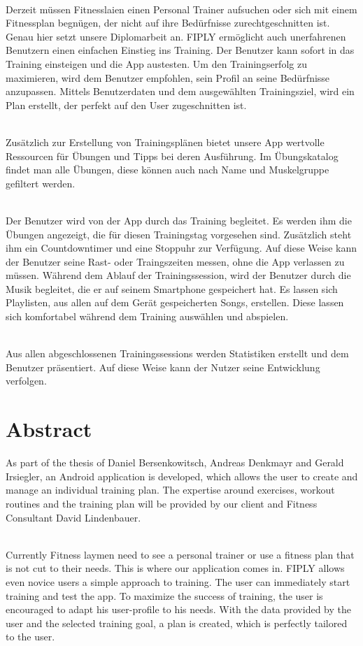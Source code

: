 \documentclass[FIPLY_base.tex]{subfiles}
\begin{document}
\ \\
Derzeit müssen Fitnesslaien einen Personal Trainer aufsuchen oder sich mit einem Fitnessplan begnügen, der nicht auf ihre Bedürfnisse zurechtgeschnitten ist. Genau hier setzt unsere Diplomarbeit an. FIPLY ermöglicht auch unerfahrenen Benutzern einen einfachen Einstieg ins Training. Der Benutzer kann sofort in das Training einsteigen und die App austesten.
Um den Trainingserfolg zu maximieren, wird dem Benutzer empfohlen, sein Profil an seine Bedürfnisse anzupassen.
Mittels Benutzerdaten und dem ausgewählten Trainingsziel, wird ein Plan erstellt, der perfekt auf den User zugeschnitten ist.

\ \\
Zusätzlich zur Erstellung von Trainingsplänen bietet unsere App wertvolle Ressourcen für Übungen und Tipps bei deren Ausführung. Im Übungskatalog findet man alle Übungen, diese können auch nach Name und Muskelgruppe gefiltert werden.

\ \\
Der Benutzer wird von der App durch das Training begleitet. Es werden ihm die Übungen angezeigt, die für diesen Trainingstag vorgesehen sind. Zusätzlich steht ihm ein Countdowntimer und eine Stoppuhr zur Verfügung. Auf diese Weise kann der Benutzer seine Rast- oder Traingszeiten messen, ohne die App verlassen zu müssen.  
Während dem Ablauf der Trainingssession, wird der Benutzer durch die Musik begleitet, die er auf seinem Smartphone gespeichert hat.
Es lassen sich Playlisten, aus allen auf dem Gerät gespeicherten Songs, erstellen. Diese lassen sich komfortabel während dem Training auswählen und abspielen.

\ \\
Aus allen abgeschlossenen Trainingssessions werden Statistiken erstellt und dem Benutzer präsentiert.
Auf diese Weise kann der Nutzer seine Entwicklung verfolgen. 

\section{Abstract}
As part of the thesis of Daniel Bersenkowitsch, Andreas Denkmayr and Gerald Irsiegler, an Android application is developed, which allows the user to create and manage an individual training plan.
The expertise around exercises, workout routines and the training plan will be provided by our client and Fitness Consultant David Lindenbauer.

\ \\
Currently Fitness laymen need to see a personal trainer or use a fitness plan that is not cut to their needs. This is where our application comes in. FIPLY allows even novice users a simple approach to training. The user can immediately start training and test the app.
To maximize the success of training, the user is encouraged to adapt his user-profile to his needs.
With the data provided by the user and the selected training goal, a plan is created, which is perfectly tailored to the user.
\end{document}
